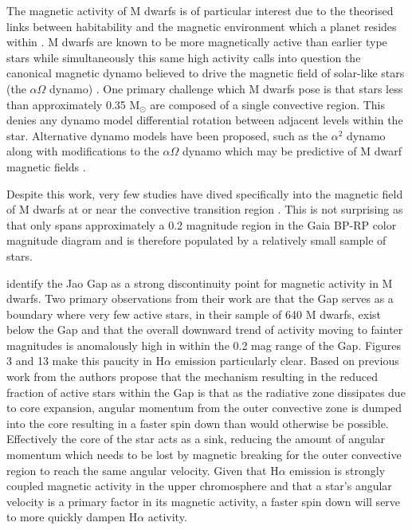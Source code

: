 The magnetic activity of M dwarfs is of particular interest due to the
theorised links between habitability and the magnetic environment which a
planet resides within \citep[e.g.][]{Lammer2012,Gallet2017, Kislyakova2017}. M
dwarfs are known to be more magnetically active than earlier type stars
\citep{Saar1985,Astudillo-Defru2017,Wright2018} while simultaneously this same
high activity calls into question the canonical magnetic dynamo believed to
drive the magnetic field of solar-like stars (the $\alpha\Omega$ dynamo)
\citep{Shulyak2015}. One primary challenge which M dwarfs pose is that stars
less than approximately 0.35 M$_{\odot}$ are composed of a single convective
region. This denies any dynamo model differential rotation between adjacent
levels within the star. Alternative dynamo models have been proposed, such as
the $\alpha^{2}$ dynamo along with modifications to the $\alpha\Omega$ dynamo
which may be predictive of M dwarf magnetic fields \citep{Chabrier2006,
Kochukhov2021, Kleeorin2023}.

Despite this work, very few studies have dived specifically into the magnetic
field of M dwarfs at or near the convective transition region . This is not
surprising as that only spans approximately a 0.2 magnitude region
in the Gaia BP-RP color magnitude diagram and is therefore populated by a
relatively small sample of stars. 

\citet{Jao2023} identify the Jao Gap as a strong discontinuity point for
magnetic activity in M dwarfs. Two primary observations from their work are
that the Gap serves as a boundary where very few active stars, in their sample
of 640 M dwarfs, exist below the Gap and that the overall downward trend of
activity moving to fainter magnitudes is anomalously high in within the 0.2 mag
range of the Gap. \citeauthor{Jao2023} Figures 3 and 13 make this paucity in
H$\alpha$ emission particularly clear. Based on previous work from
\citet{Spada2020, Curtis2020, Dungee2022} the authors propose that the
mechanism resulting in the reduced fraction of active stars within the Gap is
that as the radiative zone dissipates due to core expansion, angular momentum
from the outer convective zone is dumped into the core resulting in a faster
spin down than would otherwise be possible. Effectively the core of the star
acts as a sink, reducing the amount of angular momentum which needs to be lost
by magnetic breaking for the outer convective region to reach the same angular
velocity. Given that H$\alpha$ emission is strongly coupled magnetic activity
in the upper chromosphere \citep{Newton2016, Kumar2023} and that a star's angular velocity
is a primary factor in its magnetic activity, a faster spin down will serve to
more quickly dampen H$\alpha$ activity.

